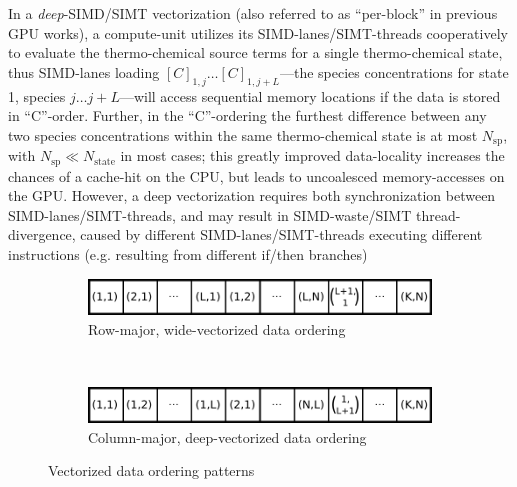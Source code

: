 \documentclass[12pt,number,sort&compress,preprint]{elsarticle}
\begin{document}
In a \textit{deep}-SIMD\slash SIMT vectorization (also referred to as ``per-block'' in previous GPU works), a compute-unit utilizes its SIMD-lanes\slash SIMT-threads cooperatively to evaluate the thermo-chemical source terms for a single thermo-chemical state, thus SIMD-lanes loading $[C]_{1, j} \ldots [C]_{1, j + L}$---the species concentrations for state 1, species $j \ldots j + L$---will access sequential memory locations if the data is stored in ``C''-order.
Further, in the ``C''-ordering the furthest difference between any two species concentrations within the same thermo-chemical state is at most $N_{\text{sp}}$, with $N_{\text{sp}} \ll N_{\text{state}}$ in most cases; this greatly improved data-locality increases the chances of a cache-hit on the CPU, but leads to uncoalesced memory-accesses on the GPU.
However, a deep vectorization requires both synchronization between SIMD-lanes\slash SIMT-threads, and may result in SIMD-waste\slash SIMT thread-divergence, caused by different SIMD-lanes\slash SIMT-threads executing different instructions (e.g. resulting from different if\slash then branches)

\begin{figure}[htb]
  \centering
  \begin{minipage}{0.6\linewidth}
    \begin{subfigure}[t]{\textwidth}
	\includegraphics[width=\textwidth]{row_major_split.pdf}
	\caption{Row-major, wide-vectorized data ordering}
	\label{F:row_major_split}
    \end{subfigure}
    \\
    \begin{subfigure}[t]{\textwidth}
	\includegraphics[width=\textwidth]{column_major_split.pdf}
	\caption{Column-major, deep-vectorized data ordering}
	\label{F:column_major_split}
    \end{subfigure}
  \end{minipage}
  \caption{Vectorized data ordering patterns}
  \label{F:vector_data}
\end{figure}
\end{document}
